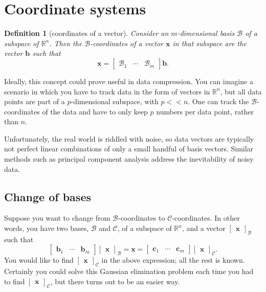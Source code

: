 \documentclass[draft,12pt]{report}
\newtheorem{definition}{Definition}
\renewcommand{\vec}[1]{\mathbf{#1}}
\begin{document}
\section{Coordinate systems}

\begin{definition}[coordinates of a vector]
    Consider an $m$-dimensional basis $\mathcal{B}$ of a subspace of $\mathbb R^n$. Then the $\mathcal{B}$-coordinates of a vector $\vec{x}$ in that subspace are the vector $\vec{b}$ such that
    \[ \vec{x} = \begin{bmatrix} 
        \mathcal{B}_1 & \cdots & \mathcal{B}_m
    \end{bmatrix}\vec{b}. \]
\end{definition}
\noindent
Ideally, this concept could prove useful in data compression. You can imagine a scenario in which you have to track data in the form of vectors in $\mathbb R^n$, but all data points are part of a $p$-dimensional subspace, with $p << n$. One can track the $\mathcal{B}$-coordinates of the data and have to only keep $p$ numbers per data point, rather than $n$.

Unfortunately, the real world is riddled with noise, so data vectors are typically not perfect linear combinations of only a small handful of basis vectors. Similar methods such as principal component analysis address the inevitability of noisy data.

\subsection{Change of bases}

Suppose you want to change from $\mathcal{B}$-coordinates to $\mathcal{C}$-coordinates. In other words, you have two bases, $\mathcal{B}$ and $\mathcal{C}$, of a subspace of $\mathbb R^n$, and a vector $\begin{bmatrix} \vec{x} \end{bmatrix}_\mathcal{B}$ such that
\[ \begin{bmatrix} \vec{b}_1 & \cdots & \vec{b}_m \end{bmatrix} \begin{bmatrix} \vec{x} \end{bmatrix}_\mathcal{B} = \vec{x} = \begin{bmatrix} \vec{c}_1 & \cdots & \vec{c}_m \end{bmatrix} \begin{bmatrix} \vec{x} \end{bmatrix}_\mathcal{C}. \]
You would like to find $\begin{bmatrix} \vec{x} \end{bmatrix}_\mathcal{C}$ in the above expression; all the rest is known. Certainly you could solve this Gaussian elimination problem each time you had to find $\begin{bmatrix} \vec{x} \end{bmatrix}_\mathcal{C}$, but there turns out to be an easier way. 
\end{document}
